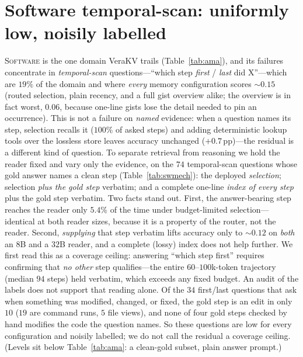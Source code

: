 \documentclass{article} %
\newcommand{\pp}{\,\mathrm{pp}}
\newcommand{\kvm}{VeraKV}
\begin{document}
\section{Software temporal-scan: uniformly low, noisily labelled}
\label{app:swmech}
\textsc{Software} is the one domain \kvm{} trails (Table~\ref{tab:ama}), and its
failures concentrate in \emph{temporal-scan} questions---``which step \emph{first}
/ \emph{last} did X''---which are $19\%$ of the domain and where \emph{every} memory
configuration scores $\sim\!0.15$ (routed selection, plain recency, and a full
gist overview alike; the overview is in fact worst, $0.06$, because one-line gists
lose the detail needed to pin an occurrence). This is not a failure on \emph{named}
evidence: when a question names its step, selection recalls it ($100\%$ of asked
steps) and adding deterministic lookup tools over the lossless store leaves accuracy
unchanged ($+0.7\pp$)---the residual is a different kind of question. To separate
retrieval from reasoning
we hold the reader fixed and vary only the evidence, on the $74$ temporal-scan
questions whose gold answer names a clean step (Table~\ref{tab:swmech}): the
deployed \emph{selection}; selection \emph{plus the gold step} verbatim; and a
complete one-line \emph{index of every step} plus the gold step verbatim. Two facts
stand out. First, the answer-bearing step reaches the reader only $5.4\%$ of the
time under budget-limited selection---identical at both reader sizes, because it is
a property of the router, not the reader. Second, \emph{supplying}
that step verbatim lifts accuracy only to $\sim\!0.12$ on \emph{both} an $8$B and a
$32$B reader, and a complete (lossy) index does not help further. We first read this
as a coverage ceiling: answering ``which step first'' requires confirming that
\emph{no other} step qualifies---the entire
$60$--$100$k-token trajectory (median $94$ steps) held verbatim, which exceeds any
fixed budget. An audit of the labels does not support that reading alone. Of the $34$
first/last questions that ask when something was modified, changed, or fixed, the gold
step is an edit in only $10$ ($19$ are command runs, $5$ file views), and none of four
gold steps checked by hand modifies the code the question names. So these questions are
low for every configuration and noisily labelled; we do not call the residual a coverage
ceiling. (Levels sit below Table~\ref{tab:ama}: a clean-gold subset, plain answer prompt.)
\end{document}
